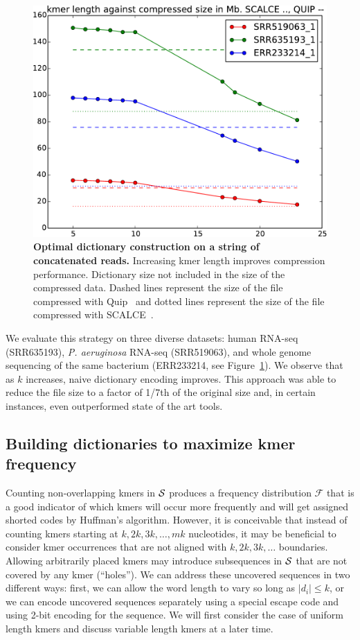 \documentclass[12pt]{cmuthesis}
\begin{document}
  \begin{figure}[ht]
    \centering
    \includegraphics[width=0.7\linewidth]{figures/vary-k-fullfile-singleline}
    \caption{\textbf{Optimal dictionary construction on a string of concatenated reads.} Increasing kmer length improves compression performance. Dictionary size not included in the size of the compressed data. Dashed lines represent the size of the file compressed with Quip~\cite{Jones2012} and dotted lines represent the size of the file compressed with SCALCE~\cite{Sahinalp2012}.}
    \label{fig:denovocompr:varyK}
  \end{figure}

  We evaluate this strategy on three diverse datasets: human RNA-seq (SRR635193), \textit{P. aeruginosa} RNA-seq (SRR519063), and whole genome sequencing of the same bacterium (ERR233214, see Figure~\ref{fig:denovocompr:varyK}). We observe that as $k$ increases, naive dictionary encoding improves. This approach was able to reduce the file size to a factor of 1/7th of the original size and, in certain instances, even outperformed state of the art tools.

  \subsection{Building dictionaries to maximize kmer frequency}

  Counting non-overlapping kmers in $\mathcal{S}$ produces a frequency distribution $\mathcal{F}$ that is a good indicator of which kmers will occur more frequently and will get assigned shorted codes by Huffman's algorithm. However, it is conceivable that instead of counting kmers starting at $k, 2k, 3k, \ldots, mk$ nucleotides, it may be beneficial to consider kmer occurrences that are not aligned with $k, 2k, 3k, \ldots$ boundaries. Allowing arbitrarily placed kmers may introduce subsequences in $\mathcal{S}$ that are not covered by any kmer (``holes''). We can address these uncovered sequences in two different ways: first, we can allow the word length to vary so long as $|d_i| \leq k$, or we can encode uncovered sequences separately using a special escape code and using 2-bit encoding for the sequence. We will first consider the case of uniform length kmers and discuss variable length kmers at a later time.
\end{document}
